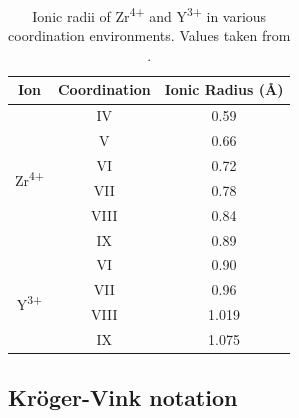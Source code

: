 
\begin{table}[htp]
\onehalfspacing
\centering
\caption[Ionic radii of Zr\textsuperscript{4+} and Y\textsuperscript{3+} in various coordination environments.]{Ionic radii of Zr\textsuperscript{4+} and Y\textsuperscript{3+} in various coordination environments. Values taken from \cite{Shannon1976}.}
\label{figure:ionicradii}
\begin{tabular}{ccc}
\hline
Ion & Coordination & Ionic Radius (\r{A}) \\ \hline
\multicolumn{1}{c}{\multirow{6}{*}{Zr\textsuperscript{4+}}} & \multicolumn{1}{c}{IV} & 0.59 \\
\multicolumn{1}{c}{} & \multicolumn{1}{c}{V} & 0.66 \\
\multicolumn{1}{c}{} & \multicolumn{1}{c}{VI} & 0.72 \\
\multicolumn{1}{c}{} & \multicolumn{1}{c}{VII} & 0.78 \\
\multicolumn{1}{c}{} & \multicolumn{1}{c}{VIII} & 0.84 \\
\multicolumn{1}{c}{} & \multicolumn{1}{c}{IX} & 0.89 \\ \hline
\multicolumn{1}{c}{\multirow{4}{*}{Y\textsuperscript{3+}}} & \multicolumn{1}{c}{VI} & 0.90 \\
\multicolumn{1}{c}{} & \multicolumn{1}{c}{VII} & 0.96 \\
\multicolumn{1}{c}{} & \multicolumn{1}{c}{VIII} & 1.019 \\
\multicolumn{1}{c}{} & \multicolumn{1}{c}{IX} & 1.075 \\ \hline
\end{tabular}
\end{table}


\subsection{Kr\"{o}ger-Vink notation}

